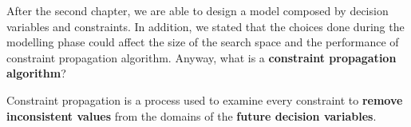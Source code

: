 After the second chapter, we are able to design a model composed by decision variables and constraints. In addition, we stated that the choices done during 
the modelling phase could affect the size of the search space and the performance of constraint propagation algorithm. Anyway, 
what is a \textbf{constraint propagation algorithm}?
\begin{definition}[title = Constraint propagation]
    Constraint propagation is a process used to examine every constraint to \textbf{remove inconsistent values} from the domains of the \textbf{future decision variables}.
\end{definition}